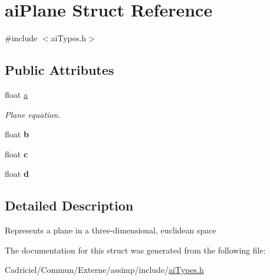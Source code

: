 \hypertarget{structai_plane}{\section{ai\-Plane Struct Reference}
\label{structai_plane}
}


{\ttfamily \#include $<$ai\-Types.\-h$>$}

\subsection*{Public Attributes}
\begin{DoxyCompactItemize}
\item 
\hypertarget{structai_plane_aeadf64e70e6daf1f7f431c90cfc8bce1}{float \hyperlink{structai_plane_aeadf64e70e6daf1f7f431c90cfc8bce1}{a}}\label{structai_plane_aeadf64e70e6daf1f7f431c90cfc8bce1}

\begin{DoxyCompactList}\small\item\em Plane equation. \end{DoxyCompactList}\item 
\hypertarget{structai_plane_a84ab33cd9b2f5325282b489f8a2bf11c}{float {\bfseries b}}\label{structai_plane_a84ab33cd9b2f5325282b489f8a2bf11c}

\item 
\hypertarget{structai_plane_a7b0ea36c355ca003a5789088fb24da1f}{float {\bfseries c}}\label{structai_plane_a7b0ea36c355ca003a5789088fb24da1f}

\item 
\hypertarget{structai_plane_ab8696b583b6fab46ae30cd5b691e7c9a}{float {\bfseries d}}\label{structai_plane_ab8696b583b6fab46ae30cd5b691e7c9a}

\end{DoxyCompactItemize}


\subsection{Detailed Description}
Represents a plane in a three-\/dimensional, euclidean space 

The documentation for this struct was generated from the following file\-:\begin{DoxyCompactItemize}
\item 
Cadriciel/\-Commun/\-Externe/assimp/include/\hyperlink{ai_types_8h}{ai\-Types.\-h}\end{DoxyCompactItemize}
